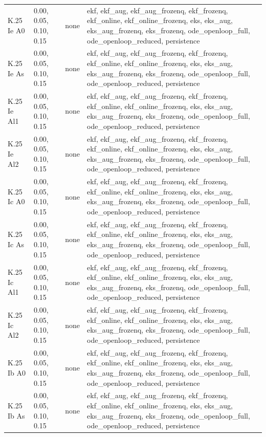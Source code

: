 \begin{table}[t]
\begin{tabular}{llll}
K.25 Ie A0 & 0.00, 0.05, 0.10, 0.15 & none & ekf, ekf\_aug, ekf\_aug\_frozenq, ekf\_frozenq, ekf\_online, ekf\_online\_frozenq, eks, eks\_aug, eks\_aug\_frozenq, eks\_frozenq, ode\_openloop\_full, ode\_openloop\_reduced, persistence \\
K.25 Ie As & 0.00, 0.05, 0.10, 0.15 & none & ekf, ekf\_aug, ekf\_aug\_frozenq, ekf\_frozenq, ekf\_online, ekf\_online\_frozenq, eks, eks\_aug, eks\_aug\_frozenq, eks\_frozenq, ode\_openloop\_full, ode\_openloop\_reduced, persistence \\
K.25 Ie Al1 & 0.00, 0.05, 0.10, 0.15 & none & ekf, ekf\_aug, ekf\_aug\_frozenq, ekf\_frozenq, ekf\_online, ekf\_online\_frozenq, eks, eks\_aug, eks\_aug\_frozenq, eks\_frozenq, ode\_openloop\_full, ode\_openloop\_reduced, persistence \\
K.25 Ie Al2 & 0.00, 0.05, 0.10, 0.15 & none & ekf, ekf\_aug, ekf\_aug\_frozenq, ekf\_frozenq, ekf\_online, ekf\_online\_frozenq, eks, eks\_aug, eks\_aug\_frozenq, eks\_frozenq, ode\_openloop\_full, ode\_openloop\_reduced, persistence \\
K.25 Ic A0 & 0.00, 0.05, 0.10, 0.15 & none & ekf, ekf\_aug, ekf\_aug\_frozenq, ekf\_frozenq, ekf\_online, ekf\_online\_frozenq, eks, eks\_aug, eks\_aug\_frozenq, eks\_frozenq, ode\_openloop\_full, ode\_openloop\_reduced, persistence \\
K.25 Ic As & 0.00, 0.05, 0.10, 0.15 & none & ekf, ekf\_aug, ekf\_aug\_frozenq, ekf\_frozenq, ekf\_online, ekf\_online\_frozenq, eks, eks\_aug, eks\_aug\_frozenq, eks\_frozenq, ode\_openloop\_full, ode\_openloop\_reduced, persistence \\
K.25 Ic Al1 & 0.00, 0.05, 0.10, 0.15 & none & ekf, ekf\_aug, ekf\_aug\_frozenq, ekf\_frozenq, ekf\_online, ekf\_online\_frozenq, eks, eks\_aug, eks\_aug\_frozenq, eks\_frozenq, ode\_openloop\_full, ode\_openloop\_reduced, persistence \\
K.25 Ic Al2 & 0.00, 0.05, 0.10, 0.15 & none & ekf, ekf\_aug, ekf\_aug\_frozenq, ekf\_frozenq, ekf\_online, ekf\_online\_frozenq, eks, eks\_aug, eks\_aug\_frozenq, eks\_frozenq, ode\_openloop\_full, ode\_openloop\_reduced, persistence \\
K.25 Ib A0 & 0.00, 0.05, 0.10, 0.15 & none & ekf, ekf\_aug, ekf\_aug\_frozenq, ekf\_frozenq, ekf\_online, ekf\_online\_frozenq, eks, eks\_aug, eks\_aug\_frozenq, eks\_frozenq, ode\_openloop\_full, ode\_openloop\_reduced, persistence \\
K.25 Ib As & 0.00, 0.05, 0.10, 0.15 & none & ekf, ekf\_aug, ekf\_aug\_frozenq, ekf\_frozenq, ekf\_online, ekf\_online\_frozenq, eks, eks\_aug, eks\_aug\_frozenq, eks\_frozenq, ode\_openloop\_full, ode\_openloop\_reduced, persistence \\

\end{tabular}
\end{table}
